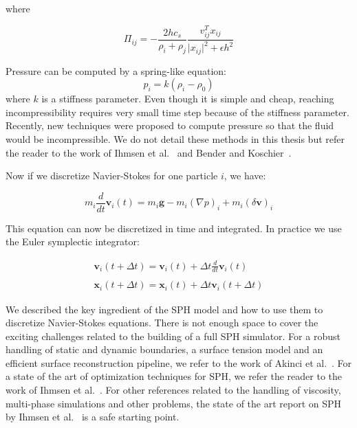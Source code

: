 where 

\begin{equation}
\Pi_{ij} = -\frac{2hc_{s}}{\rho_{i}+\rho_{j}}\frac{v_{ij}^{T}x_{ij}}{\vert x_{ij} \vert^{2} + \epsilon h^{2}}
\end{equation}

Pressure can be computed by a spring-like equation:
\begin{equation}
\label{eq:pressureSPH}
p_{i} = k\left(\rho_{i}-\rho_{0}\right)
\end{equation}
where $k$ is a stiffness parameter. Even though it is simple and cheap, reaching incompressibility requires very small time step because of the stiffness parameter. Recently, new techniques were proposed to compute pressure so that the fluid would be incompressible. We do not detail these methods in this thesis but refer the reader to the work of Ihmsen et al.~\cite{Ihmsen2014} and Bender and Koschier~\cite{Bender2015}.

Now if we discretize Navier-Stokes for one particle $i$, we have:

\begin{equation}
m_{i}\frac{d}{dt}\mathbf{v}_{i}(t) = m_{i}\mathbf{g} - m_{i}(\nabla p)_{i} + m_{i}(\delta \mathbf{v})_{i}
\end{equation}

This equation can now be discretized in time and integrated. In practice we use the Euler symplectic integrator:

\begin{equation}
\begin{array}{ll}
\displaystyle \mathbf{v}_{i}(t+\Delta t) = \mathbf{v}_{i}(t) + \Delta t \frac{d}{dt}\mathbf{v}_{i}(t) \\ \\
\displaystyle \mathbf{x}_{i}(t+\Delta t) = \mathbf{x}_{i}(t) + \Delta t \mathbf{v}_{i}(t+\Delta t)
\end{array}
\end{equation}

We described the key ingredient of the SPH model and how to use them to discretize Navier-Stokes equations. There is not enough space to cover the exciting challenges related to the building of a full SPH simulator. For a robust handling of static and dynamic boundaries, a surface tension model and an efficient surface reconstruction pipeline, we refer to the work of Akinci et al.~\cite{Akinci2012b, Akinci2013, Akinci2012a}.  For a state of the art of optimization techniques for SPH, we refer the reader to the work of Ihmsen et al.~\cite{Ihmsen2011}. For other references related to the handling of viscosity, multi-phase simulations and other problems, the state of the art report on SPH by Ihmsen et al.~\cite{Ihmsen2014} is a safe starting point.

